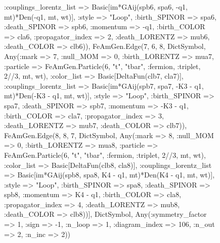 \documentclass{revtex4}
\begin{document}
\begin{figure}[!htb]
\begin{center}
{:couplings_lorentz_list => Basic[im*GAij(spb6, spa6, -q1, mt)*Den(-q1, mt, wt)], :style => "Loop", :birth_SPINOR => spa6, :death_SPINOR => spb6, :momentum => -q1, :birth_COLOR => cla6, :propagator_index => 2, :death_LORENTZ => mub6, :death_COLOR => clb6)), FeAmGen.Edge(7, 6, 8, Dict{Symbol, Any}(:mark => 7, :null_MOM => 0, :birth_LORENTZ => mua7, :particle => FeAmGen.Particle(6, "t", "tbar", :fermion, :triplet, 2//3, mt, wt), :color_list => Basic[DeltaFun(clb7, cla7)], :couplings_lorentz_list => Basic[im*GAij(spb7, spa7, -K3 - q1, mt)*Den(-K3 - q1, mt, wt)], :style => "Loop", :birth_SPINOR => spa7, :death_SPINOR => spb7, :momentum => -K3 - q1, :birth_COLOR => cla7, :propagator_index => 3, :death_LORENTZ => mub7, :death_COLOR => clb7)), FeAmGen.Edge(8, 8, 7, Dict{Symbol, Any}(:mark => 8, :null_MOM => 0, :birth_LORENTZ => mua8, :particle => FeAmGen.Particle(6, "t", "tbar", :fermion, :triplet, 2//3, mt, wt), :color_list => Basic[DeltaFun(clb8, cla8)], :couplings_lorentz_list => Basic[im*GAij(spb8, spa8, K4 - q1, mt)*Den(K4 - q1, mt, wt)], :style => "Loop", :birth_SPINOR => spa8, :death_SPINOR => spb8, :momentum => K4 - q1, :birth_COLOR => cla8, :propagator_index => 4, :death_LORENTZ => mub8, :death_COLOR => clb8))], Dict{Symbol, Any}(:symmetry_factor => 1, :sign => -1, :n_loop => 1, :diagram_index => 106, :n_out => 2, :n_inc => 2)) 
}
\end{center}
\end{figure}
\end{document}

